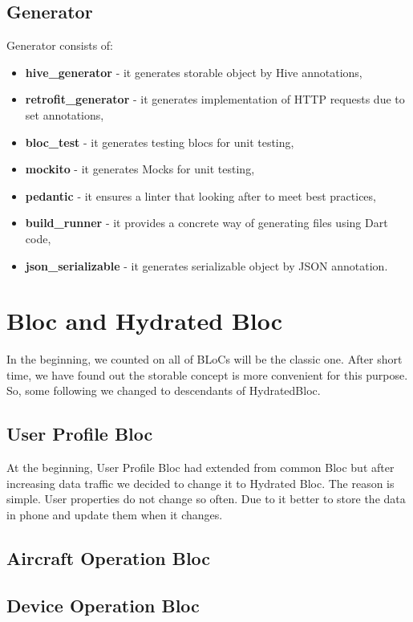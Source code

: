 \subsection{Generator}\label{subsec:generator}
Generator consists of:
\begin{itemize}
    \item \textbf{hive\_generator} - it generates storable object by Hive annotations,
    \item \textbf{retrofit\_generator} - it generates implementation of HTTP requests due to set annotations,
    \item \textbf{bloc\_test} - it generates testing blocs for unit testing,
    \item \textbf{mockito} - it generates Mocks for unit testing,
    \item \textbf{pedantic} - it ensures a linter that looking after to meet best practices,
    \item \textbf{build\_runner} - it provides a concrete way of generating files using Dart code,
    \item \textbf{json\_serializable} - it generates serializable object by JSON annotation.
\end{itemize}

\section{Bloc and Hydrated Bloc}\label{sec:bloc-and-hydrated-bloc}
In the beginning, we counted on all of BLoCs will be the classic one.
After short time, we have found out the storable concept is more convenient for this purpose.
So, some following we changed to descendants of HydratedBloc.

\subsection{User Profile Bloc}\label{subsec:user-profile-bloc}
At the beginning, User Profile Bloc had extended from common Bloc but after increasing data traffic we decided to change it to Hydrated Bloc.
The reason is simple.
User properties do not change so often.
Due to it better to store the data in phone and update them when it changes.

\subsection{Aircraft Operation Bloc}\label{subsec:aircraft-operation-bloc}
\subsection{Device Operation Bloc}\label{subsec:device-operation-bloc}
